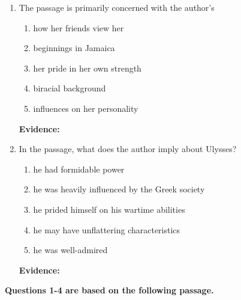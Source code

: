\begin{enumerate}
\item The passage is primarily concerned with the author's 

\begin{enumerate}[label=(\Alph*)]
\item how her friends view her
\item beginnings in Jamaica
\item her pride in her own strength
\item biracial background
\item influences on her personality
\end{enumerate}

\bigskip
\textbf{Evidence:} \hrulefill

\item In the passage, what does the author imply about Ulysses?

\begin{enumerate}[label=(\Alph*)]
\item he had formidable power
\item he was heavily influenced by the Greek society
\item he prided himself on his wartime abilities
\item he may have unflattering characteristics
\item he was well-admired
\end{enumerate}

\bigskip
\textbf{Evidence:} \hrulefill

\end{enumerate}

\textbf{Questions 1-4 are based on the following passage.}

